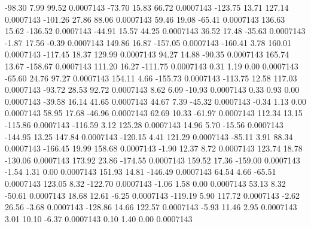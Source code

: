       -98.30        7.99       99.52     0.0007143
      -73.70       15.83       66.72     0.0007143
     -123.75       13.71      127.14     0.0007143
     -101.26       27.86       88.06     0.0007143
       59.46       19.08      -65.41     0.0007143
      136.63       15.62     -136.52     0.0007143
      -44.91       15.57       44.25     0.0007143
       36.52       17.48      -35.63     0.0007143
       -1.87       17.56       -0.39     0.0007143
      149.86       16.87     -157.05     0.0007143
     -160.41        3.78      160.01     0.0007143
     -117.45       18.37      129.99     0.0007143
       94.27       14.88      -90.35     0.0007143
      165.74       13.67     -158.67     0.0007143
      111.20       16.27     -111.75     0.0007143
        0.31        1.19        0.00     0.0007143
      -65.60       24.76       97.27     0.0007143
      154.11        4.66     -155.73     0.0007143
     -113.75       12.58      117.03     0.0007143
      -93.72       28.53       92.72     0.0007143
        8.62        6.09      -10.93     0.0007143
        0.33        0.93        0.00     0.0007143
      -39.58       16.14       41.65     0.0007143
       44.67        7.39      -45.32     0.0007143
       -0.34        1.13        0.00     0.0007143
       58.95       17.68      -46.96     0.0007143
       62.69       10.33      -61.97     0.0007143
      112.34       13.15     -115.86     0.0007143
     -116.59        3.12      125.28     0.0007143
       14.96        5.70      -15.56     0.0007143
     -144.95       13.25      147.84     0.0007143
     -120.15        4.41      121.29     0.0007143
      -85.11        3.91       88.34     0.0007143
     -166.45       19.99      158.68     0.0007143
       -1.90       12.37        8.72     0.0007143
      123.74       18.78     -130.06     0.0007143
      173.92       23.86     -174.55     0.0007143
      159.52       17.36     -159.00     0.0007143
       -1.54        1.31        0.00     0.0007143
      151.93       14.81     -146.49     0.0007143
       64.54        4.66      -65.51     0.0007143
      123.05        8.32     -122.70     0.0007143
       -1.06        1.58        0.00     0.0007143
       53.13        8.32      -50.61     0.0007143
       18.68       12.61       -6.25     0.0007143
     -119.19        5.90      117.72     0.0007143
       -2.62       26.56       -3.68     0.0007143
     -128.86       14.66      122.57     0.0007143
       -5.93       11.46        2.95     0.0007143
        3.01       10.10       -6.37     0.0007143
        0.10        1.40        0.00     0.0007143
